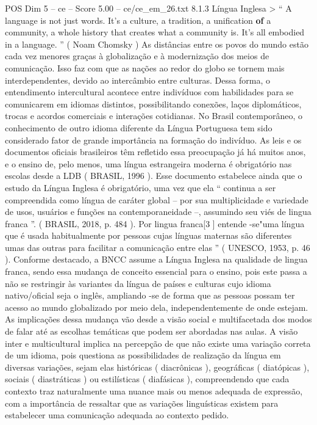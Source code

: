 \begin{textsample}{POS Dim 5 – ce – Score 5.00 – ce/ce\_em\_26.txt}  \label{ex:f5_pos_253}
8.1.3 Língua Inglesa > “ A language is not just words.
It’s a culture, a tradition, a unification \textbf{of} a community, a whole history that creates what a community is.
It’s all embodied in a language. ” ( Noam Chomsky ) As distâncias entre os povos do mundo estão cada vez menores graças à globalização e à modernização dos meios de comunicação.
Isso faz com que as nações ao redor do globo se tornem mais interdependentes, devido ao intercâmbio entre culturas.
Dessa forma, o entendimento intercultural acontece entre indivíduos com habilidades para se comunicarem em idiomas distintos, possibilitando conexões, laços diplomáticos, trocas e acordos comerciais e interações cotidianas.
No Brasil contemporâneo, o conhecimento de outro idioma diferente da Língua Portuguesa tem sido considerado fator de grande importância na formação do indivíduo.
As leis e os documentos oficiais brasileiros têm refletido essa preocupação já há muitos anos, e o ensino de, pelo menos, uma língua estrangeira moderna é obrigatório nas escolas desde a LDB ( BRASIL, 1996 ).
Esse documento estabelece ainda que o estudo da Língua Inglesa é obrigatório, uma vez que ela “ continua a ser compreendida como língua de caráter global – por sua multiplicidade e variedade de usos, usuários e funções na contemporaneidade –, assumindo seu viés de lingua franca ”. ( BRASIL, 2018, p. 484 ).
Por lingua franca[3 ] entende -se"uma língua que é usada habitualmente por pessoas cujas línguas maternas são diferentes umas das outras para facilitar a comunicação entre elas ” ( UNESCO, 1953, p. 46 ).
Conforme destacado, a BNCC assume a Língua Inglesa na qualidade de lingua franca, sendo essa mudança de conceito essencial para o ensino, pois este passa a não se restringir às variantes da língua de países e culturas cujo idioma nativo/oficial seja o inglês, ampliando -se de forma que as pessoas possam ter acesso ao mundo globalizado por meio dela, independentemente de onde estejam.
As implicações dessa mudança vão desde a visão social e multifacetada dos modos de falar até as escolhas temáticas que podem ser abordadas nas aulas.
A visão inter e multicultural implica na percepção de que não existe uma variação correta de um idioma, pois questiona as possibilidades de realização da língua em diversas variações, sejam elas históricas ( diacrônicas ), geográficas ( diatópicas ), sociais ( diastráticas ) ou estilísticas ( diafásicas ), compreendendo que cada contexto traz naturalmente uma nuance mais ou menos adequada de expressão, com a importância de ressaltar que as variações linguísticas existem para estabelecer uma comunicação adequada ao contexto pedido.

\end{textsample}
